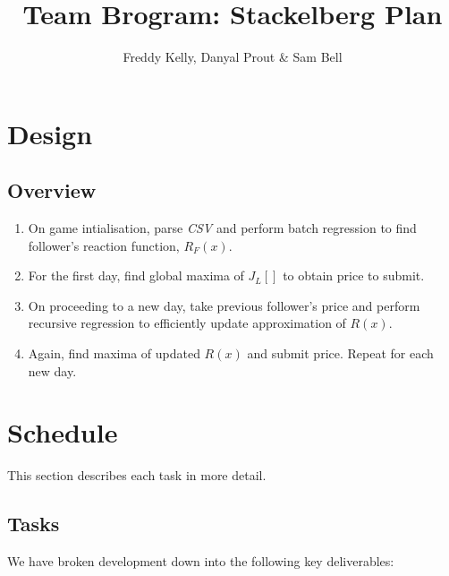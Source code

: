 \documentclass[10pt,a4paper]{report}
\title{Team Brogram: Stackelberg Plan}
\author{Freddy Kelly, Danyal Prout \& Sam Bell}
\begin{document}
\maketitle

\tableofcontents

\newpage

\section{Design}

\subsection{Overview}
\begin{enumerate}
  \item On game intialisation, parse \emph{CSV} and perform batch regression to find follower's reaction function, $R_F(x)$.
  \item For the first day, find global maxima of $J_L[]$ to obtain price to submit.
  \item On proceeding to a new day, take previous follower's price and perform recursive regression to efficiently update approximation of $R(x)$.
  \item Again, find maxima of updated $R(x)$ and submit price. Repeat for each new day.
\end{enumerate}


\newpage
\section{Schedule}
This section describes each task in more detail.

\subsection{Tasks}
We have broken development down into the following key deliverables:
\end{document}
